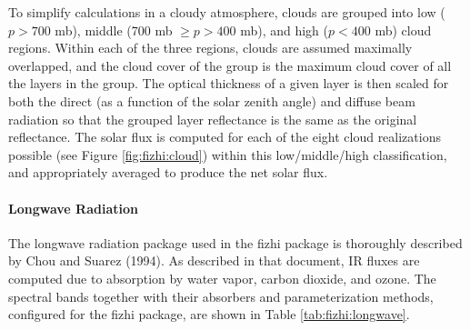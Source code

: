 To simplify calculations in a cloudy atmosphere, clouds are
grouped into low ($p>700$ mb), middle (700 mb $\ge p > 400$ mb), and high ($p < 400$ mb) cloud regions. 
Within each of the three regions, clouds are assumed maximally
overlapped, and the cloud cover of the group is the maximum
cloud cover of all the layers in the group.  The optical thickness
of a given layer is then scaled for both the direct (as a function of the
solar zenith angle) and diffuse beam radiation 
so that the grouped layer reflectance is the same as the original reflectance.
The solar flux is computed for each of the eight cloud realizations possible 
(see Figure \ref{fig:fizhi:cloud}) within this
low/middle/high classification, and appropriately averaged to produce the net solar flux.

\begin{figure*}[htbp]
  \vspace{0.4in}
  \centerline{  \epsfysize=4.0in  %
             }
  \vspace{0.4in}
  \caption  {Low-Middle-High Cloud Configurations} 
  \label{fig:fizhi:cloud}
\end{figure*}


\paragraph{Longwave Radiation}

The longwave radiation package used in the fizhi package is thoroughly described by Chou and Suarez (1994).
As described in that document, IR fluxes are computed due to absorption by water vapor, carbon
dioxide, and ozone.  The spectral bands together with their absorbers and parameterization methods,
configured for the fizhi package, are shown in Table \ref{tab:fizhi:longwave}.


